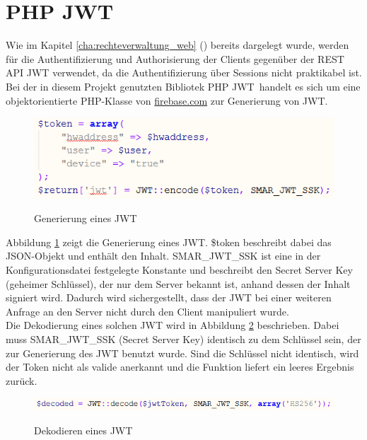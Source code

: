 \section{PHP JWT}
\label{cha:jwt}
\sloppy

Wie im Kapitel \ref{cha:rechteverwaltung_web} () bereits dargelegt wurde, werden für die Authentifizierung und Authorisierung der Clients gegenüber der \acs{REST} \acs{API} \acf{JWT} verwendet, da die Authentifizierung über Sessions nicht praktikabel ist. Bei der in diesem Projekt genutzten Bibliotek \glqq PHP JWT\grqq\ handelt es sich um eine objektorientierte \ac{PHP}-Klasse von \mbox{\url{firebase.com}} zur Generierung von \acl{JWT}.
\fussy
\begin{figure}[H]
	\centering
	{\includegraphics[scale=1.0]{Bilder/jwt_encode.png}}
	\caption{Generierung eines \acs{JWT}}
	\label{fig:jwt_encode}
\end{figure}

Abbildung \ref{fig:jwt_encode} zeigt die Generierung eines \ac{JWT}. \$token beschreibt dabei das \ac{JSON}-Objekt und enthält den Inhalt. SMAR\_JWT\_SSK ist eine in der Konfigurationsdatei festgelegte Konstante und beschreibt den Secret Server Key (geheimer Schlüssel), der nur dem Server bekannt ist, anhand dessen der Inhalt signiert wird. Dadurch wird sichergestellt, dass der \ac{JWT} bei einer weiteren Anfrage an den Server nicht durch den Client manipuliert wurde.\\

Die Dekodierung eines solchen \acl{JWT} wird in Abbildung \ref{fig:jwt_decode} beschrieben. Dabei muss SMAR\_JWT\_SSK (Secret Server Key) identisch zu dem Schlüssel sein, der zur Generierung des \ac{JWT} benutzt wurde. Sind die Schlüssel nicht identisch, wird der Token nicht als valide anerkannt und die Funktion liefert ein leeres Ergebnis zurück.

\begin{figure}[H]
	\centering
	{\includegraphics[scale=1.0]{Bilder/jwt_decode.png}}
	\caption{Dekodieren eines \acs{JWT}}
	\label{fig:jwt_decode}
\end{figure}

